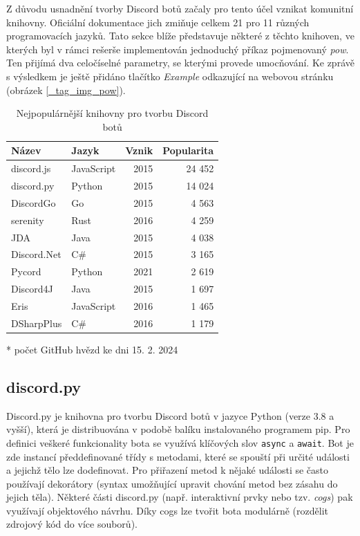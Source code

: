 \documentclass[FM]{tulthesis}
\begin{document}
	Z důvodu usnadnění tvorby Discord botů začaly pro tento účel vznikat komunitní knihovny. Oficiální dokumentace jich zmiňuje celkem 21 pro 11 různých programovacích jazyků. Tato sekce blíže představuje některé z těchto knihoven, ve kterých byl v rámci rešerše implementován jednoduchý příkaz pojmenovaný \textit{pow}. Ten přijímá dva celočíselné parametry, se kterými provede umocňování. Ke zprávě s výsledkem je ještě přidáno tlačítko \textit{Example} odkazující na webovou stránku (obrázek \ref{_tag_img_pow}).
	
	\begin{table}[ht]
		\centering
		\caption{Nejpopulárnější knihovny pro tvorbu Discord botů}\medskip
		\begin{threeparttable}
			\begin{tabular}{ l l r r }
				\textbf{Název} & \textbf{Jazyk} & \textbf{Vznik} & \textbf{Popularita}\tnote{*} \\\hline
				discord.js	& JavaScript 	& 2015 & 24 452 \\
				discord.py	& Python		& 2015 & 14 024 \\
				DiscordGo	& Go			& 2015 & 4 563 \\
				serenity	& Rust			& 2016 & 4 259 \\
				JDA			& Java			& 2015 & 4 038 \\
				Discord.Net & C\#			& 2015 & 3 165 \\
				Pycord		& Python		& 2021 & 2 619 \\
				Discord4J	& Java			& 2015 & 1 697 \\
				Eris		& JavaScript	& 2016 & 1 465 \\
				DSharpPlus	& C\#			& 2016 & 1 179 \\
			\hline\end{tabular}
			\begin{tablenotes}
				\item[*] počet GitHub hvězd ke dni 15. 2. 2024
			\end{tablenotes}
		\end{threeparttable}
	\end{table}
	
	\subsection{discord.py}
	
	Discord.py je knihovna pro tvorbu Discord botů v jazyce Python (verze 3.8 a vyšší), která je distribuována v podobě balíku instalovaného programem pip. Pro definici veškeré funkcionality bota se využívá klíčových slov \verb*|async| a \verb*|await|. Bot je zde instancí předdefinované třídy s metodami, které se spouští při určité události a jejichž tělo lze dodefinovat. Pro přiřazení metod k nějaké události se často používají dekorátory (syntax umožňující upravit chování metod bez zásahu do jejich těla). Některé části discord.py (např. interaktivní prvky nebo tzv. \textit{cogs}) pak využívají objektového návrhu. Díky cogs lze tvořit bota modulárně (rozdělit zdrojový kód do více souborů).
	
\end{document}
